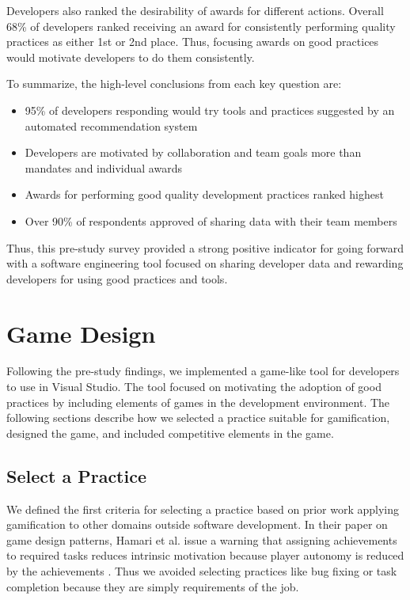 \documentclass{sig-alternate}
\begin{document}
Developers also ranked the desirability of awards for different actions.  Overall 68\% of developers ranked receiving an award for consistently performing quality practices as either 1st or 2nd place.  Thus, focusing awards on good practices would motivate developers to do them consistently.

 To summarize, the high-level conclusions from each key question are:
\begin{itemize}[itemsep=0mm]
\item 95\% of developers responding would try tools and practices suggested by an automated recommendation system 
\item Developers are motivated by collaboration and team goals more than mandates and individual awards
\item Awards for performing good quality development practices ranked highest
\item Over 90\% of respondents approved of sharing data with their team members
\end{itemize}
Thus, this pre-study survey provided a strong positive indicator for going forward with a software engineering tool focused on sharing developer data and rewarding developers for using good practices and tools. 

\section{Game Design}


Following the pre-study findings, we implemented a game-like tool for developers to use in Visual Studio.  The tool focused on motivating the adoption of good practices by including elements of games in the development environment.  The following sections describe how we selected a practice suitable for gamification, designed the game, and included competitive elements in the game.

\subsection{Select a Practice}

We defined the first criteria for selecting a practice based on prior work  applying gamification to other domains outside software development. 
In their paper on game design patterns, Hamari et al. issue a warning that assigning achievements to required tasks reduces intrinsic motivation because player autonomy is reduced by the achievements \cite{wbsnipes:Hamari2011Framework}.  Thus we avoided selecting practices like bug fixing or task completion because they are simply requirements of the job.  
\end{document}
